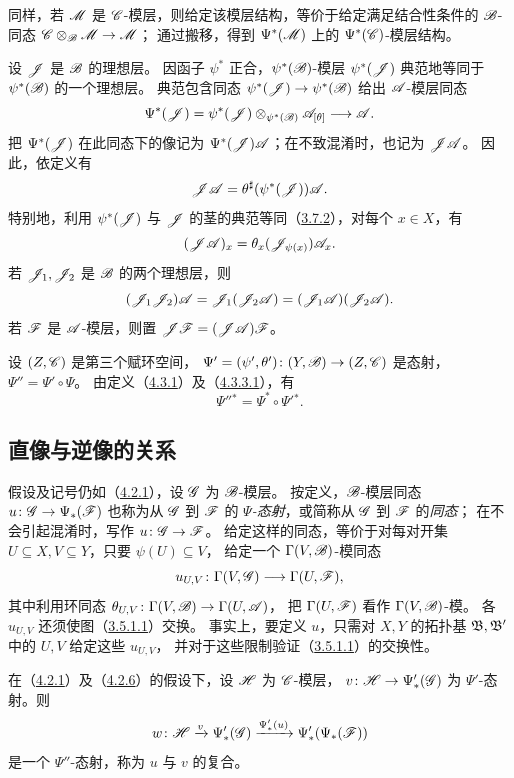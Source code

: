 同样，若 $\mathscr M$ 是 $\mathscr C$-模层，则给定该模层结构，等价于给定满足结合性条件的
$\mathscr B$-同态 $\mathscr C\otimes_{\mathscr B}\mathscr M\to\mathscr M$；
通过搬移，得到 $\Psi^*(\mathscr M)$ 上的 $\Psi^*(\mathscr C)$-模层结构。

设 $\mathscr J$ 是 $\mathscr B$ 的理想层。
因函子 $\psi^*$ 正合，$\psi^*(\mathscr B)$-模层 $\psi^*(\mathscr J)$ 典范地等同于 $\psi^*(\mathscr B)$ 的一个理想层。
典范包含同态 $\psi^*(\mathscr J)\to\psi^*(\mathscr B)$ 给出 $\mathscr A$-模层同态
\[
 \Psi^*(\mathscr J)=\psi^*(\mathscr J)\otimes_{\psi^*(\mathscr B)}\mathscr A_{[\theta]}
 \longrightarrow\mathscr A.
\]
把 $\Psi^*(\mathscr J)$ 在此同态下的像记为 $\Psi^*(\mathscr J)\mathscr A$；在不致混淆时，也记为 $\mathscr J\mathscr A$。
因此，依定义有
\[
 \mathscr J\mathscr A=\theta^\sharp(\psi^*(\mathscr J))\mathscr A.
\]
特别地，利用 $\psi^*(\mathscr J)$ 与 $\mathscr J$ 的茎的典范等同（\hyperlink{para:0:3.7.2}{3.7.2}），对每个 $x\in X$，有
\[
 (\mathscr J\mathscr A)_x=\theta_x(\mathscr J_{\psi(x)})\mathscr A_x.
\]
若 $\mathscr J_1,\mathscr J_2$ 是 $\mathscr B$ 的两个理想层，则
\[
 (\mathscr J_1\mathscr J_2)\mathscr A=\mathscr J_1(\mathscr J_2\mathscr A)=(\mathscr J_1\mathscr A)(\mathscr J_2\mathscr A).
\]
若 $\mathscr F$ 是 $\mathscr A$-模层，则置 $\mathscr J\mathscr F=(\mathscr J\mathscr A)\mathscr F$。

设 $(Z,\mathscr C)$ 是第三个赋环空间，
$\Psi'=(\psi',\theta')\colon(Y,\mathscr B)\to(Z,\mathscr C)$ 是态射，$\Psi''=\Psi'\circ\Psi$。
由定义（\hyperlink{para:0:4.3.1}{4.3.1}）及（\hyperref[eq:0:4.3.3.1]{4.3.3.1}），有
\[
 \Psi''{}^*=\Psi^*\circ\Psi'{}^*.
\]

\subsection{直像与逆像的关系}\hypertarget{heading:0:4.4}{}

假设及记号仍如（\hyperlink{para:0:4.2.1}{4.2.1}），设 $\mathscr G$ 为 $\mathscr B$-模层。
按定义，$\mathscr B$-模层同态 $u\colon\mathscr G\to\Psi_*(\mathscr F)$ 也称为从 $\mathscr G$ 到 $\mathscr F$ 的
\emph{$\Psi$-态射}，或简称从 $\mathscr G$ 到 $\mathscr F$ 的\emph{同态}；
在不会引起混淆时，写作 $u\colon\mathscr G\to\mathscr F$。
给定这样的同态，等价于对每对开集 $U\subseteq X,V\subseteq Y$，只要 $\psi(U)\subseteq V$，
给定一个 $\Gamma(V,\mathscr B)$-模同态
\[
 u_{U,V}\colon\Gamma(V,\mathscr G)\longrightarrow\Gamma(U,\mathscr F),
\]
其中利用环同态 $\theta_{U,V}\colon\Gamma(V,\mathscr B)\to\Gamma(U,\mathscr A)$，
把 $\Gamma(U,\mathscr F)$ 看作 $\Gamma(V,\mathscr B)$-模。
各 $u_{U,V}$ 还须使图（\hyperref[eq:0:3.5.1.1]{3.5.1.1}）交换。
事实上，要定义 $u$，只需对 $X,Y$ 的拓扑基 $\mathfrak B,\mathfrak B'$ 中的 $U,V$ 给定这些 $u_{U,V}$，
并对于这些限制验证（\hyperref[eq:0:3.5.1.1]{3.5.1.1}）的交换性。

在（\hyperlink{para:0:4.2.1}{4.2.1}）及（\hyperlink{para:0:4.2.6}{4.2.6}）的假设下，设 $\mathscr H$ 为 $\mathscr C$-模层，
$v\colon\mathscr H\to\Psi'_*(\mathscr G)$ 为 $\Psi'$-态射。则
\[
 w\colon\mathscr H\xrightarrow{v}\Psi'_*(\mathscr G)
 \xrightarrow{\Psi'_*(u)}\Psi'_*(\Psi_*(\mathscr F))
\]
是一个 $\Psi''$-态射，称为 $u$ 与 $v$ 的复合。

